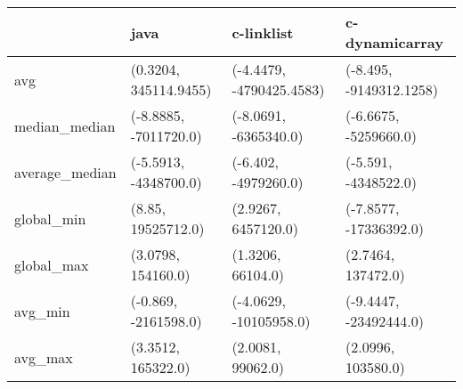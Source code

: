 \begin{tabular}{llll}
\toprule
{} &                   java &                c-linklist &           c-dynamicarray \\
\midrule
avg            &  (0.3204, 345114.9455) &  (-4.4479, -4790425.4583) &  (-8.495, -9149312.1258) \\
median\_median  &  (-8.8885, -7011720.0) &     (-8.0691, -6365340.0) &    (-6.6675, -5259660.0) \\
average\_median &  (-5.5913, -4348700.0) &      (-6.402, -4979260.0) &     (-5.591, -4348522.0) \\
global\_min     &     (8.85, 19525712.0) &       (2.9267, 6457120.0) &   (-7.8577, -17336392.0) \\
global\_max     &     (3.0798, 154160.0) &         (1.3206, 66104.0) &       (2.7464, 137472.0) \\
avg\_min        &   (-0.869, -2161598.0) &    (-4.0629, -10105958.0) &   (-9.4447, -23492444.0) \\
avg\_max        &     (3.3512, 165322.0) &         (2.0081, 99062.0) &       (2.0996, 103580.0) \\
\bottomrule
\end{tabular}
